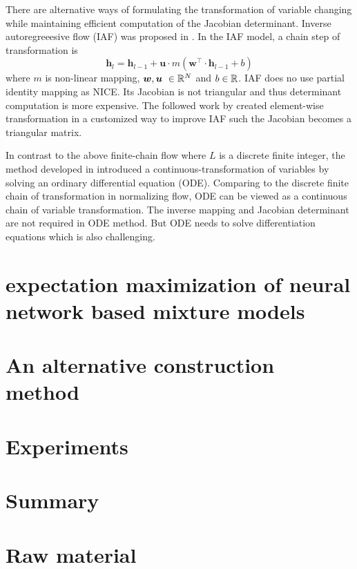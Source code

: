 \begin{remark}
  There are alternative ways of formulating the transformation of variable changing while maintaining efficient computation of the Jacobian determinant. Inverse autoregreeesive flow (IAF) was proposed in \cite{rezende2015variational}. In the IAF model, a chain step of transformation is
  \begin{equation*}
    \bm{h}_l = \bm{h}_{l-1} + \bm{u} \cdot {m}(\bm{w}^{\intercal} \cdot \bm{h}_{l-1} + b)
  \end{equation*}
  where $m$ is non-linear mapping, $\bm{w}, \bm{u}~\in \mathbb{R}^{N}$ and $b\in \mathbb{R}$. IAF does no use partial identity mapping as NICE. Its Jacobian is not triangular and thus determinant computation is more expensive. The followed work by \cite{kingma2016IVF} created element-wise transformation in a customized way to improve IAF such the Jacobian becomes a triangular matrix. 
  
  In contrast to the above finite-chain flow where $L$ is a discrete finite integer, the method developed in \cite{ricky2018ODE} introduced a continuous-transformation of variables by solving an ordinary differential equation (ODE). Comparing to the discrete finite chain of transformation in normalizing flow, ODE can be viewed as a continuous chain of variable transformation. The inverse mapping and Jacobian determinant are not required in ODE method. But ODE needs to solve differentiation equations which is also challenging.
\end{remark}



\section{expectation maximization of neural network based mixture models}

\section{An alternative construction method}

\section{Experiments}


\section{Summary}

\section{Raw material}
